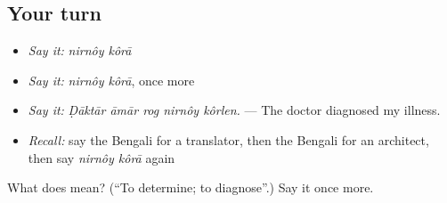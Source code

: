 \subsection*{Your turn}
\begin{itemize}
\raggedright
  \item \emph{Say it:} \emph{nirnôy kôrā}
  \item \emph{Say it:} \emph{nirnôy kôrā}, once more
  \item \emph{Say it:} \emph{Ḍāktār āmār rog nirnôy kôrlen.} — The doctor diagnosed my illness.
  \item \emph{Recall:} say the Bengali for a translator, then the Bengali for an architect, then say \emph{nirnôy kôrā} again
\end{itemize}

\begin{tcolorbox}[breakable,colback=teal!4,colframe=teal!35!black,title={Before you move on}]
What does   mean? (\textquotedblleft{}To determine; to diagnose\textquotedblright{}.) Say it once more.
\end{tcolorbox}
